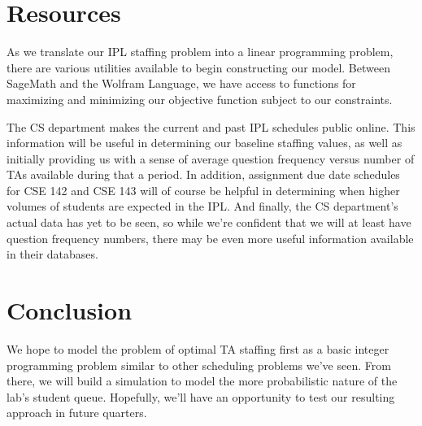 \documentclass{article}
\begin{document}
\begin{multicols}{2}
\section*{Resources}
As we translate our IPL staffing problem into a linear programming problem, there are various utilities available to begin constructing our model. Between SageMath and the Wolfram Language, we have access to functions for maximizing and minimizing our objective function subject to our constraints.

The CS department makes the current and past IPL schedules public online. This information will be useful in determining our baseline staffing values, as well as initially providing us with a sense of average question frequency versus number of TAs available during that a period. In addition, assignment due date schedules for CSE 142 and CSE 143 will of course be helpful in determining when higher volumes of students are expected in the IPL. And finally, the CS department’s actual data has yet to be seen, so while we’re confident that we will at least have question frequency numbers, there may be even more useful information available in their databases.

\section*{Conclusion}
We hope to model the problem of optimal TA staffing first as a basic integer programming problem similar to other scheduling problems we've seen. From there, we will build a simulation to model the more probabilistic nature of the lab’s student queue. Hopefully, we'll have an opportunity to test our resulting approach in future quarters.

\end{multicols}
\end{document}
